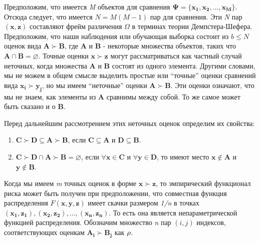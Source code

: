 \documentclass[12pt,a4paper,oneside]{article}
\begin{document}
\par
Предположим, что имеется \emph{M} объектов для сравнения \(\mathbf{\Psi} = \{\mathbf{x_1}, \mathbf{x_2}, \dots, \mathbf{x_M}\}\). 
Отсюда следует, что имеется \(N = M(M - 1)\) пар для сравнения. 
Эти \emph{N} пар \((\mathbf{x}, \mathbf{z})\) составляют фрейм различения \(\Omega\) в терминах теории Демпстера-Шефера. 
Предположим, что наши наблюдения или обучающая выборка состоит из \(b \leq N\) оценок вида \(\mathbf{A} \succ \mathbf{B}\), где \(\mathbf{A}\) и \(\mathbf{B}\) - некоторые множества объектов, таких что \(\mathbf{A} \cap \mathbf{B} = \varnothing\).  
Точные оценки \(\mathbf{x} \succ \mathbf{z}\) могут рассматриваться как частный случай неточных, когда множества \(\mathbf{A}\) и \(\mathbf{B}\) состоят из одного элемента. 
Другими словами, мы не можем в общем смысле выделить простые или ``точные'' оценки сравнений вида \(\mathbf{x_i} \succ \mathbf{y_j}\), но мы имеем ``неточные'' оценки \(\mathbf{A} \succ \mathbf{B}\). 
Эти оценки означают, что мы не знаем, как элементы из \(\mathbf{A}\) сравнимы между собой. 
То же самое может быть сказано и о \(\mathbf{B}\). 

\par
Перед дальнейшим рассмотрением этих неточных оценок определим их свойства:

\begin{enumerate}
\item \(\mathbf{C} \succ \mathbf{D} \subseteq \mathbf{A} \succ \mathbf{B}\), если \(\mathbf{C} \subseteq \mathbf{A}\) и \(\mathbf{D} \subseteq \mathbf{B}\).

\item \(\mathbf{C} \succ \mathbf{D} \cap \mathbf{A} \succ \boldsymbol{B} = \varnothing\), если \(\forall\mathbf{x} \in \mathbf{C}\) и \(\forall\mathbf{y} \in \mathbf{D}\), то имеют место \(\mathbf{x} \notin \mathbf{A}\) и \(\mathbf{y} \notin \mathbf{B}\).
\end{enumerate}


\par 
Когда мы имеем \emph{m} точных оценок в форме \(\mathbf{x} \succ \mathbf{z}\), то эмпирический функционал риска может быть получен при предположении, что совместная функция распределения \(F(\mathbf{x}, \mathbf{y}, \mathbf{z})\) имеет скачки размером \emph{1/n} в точках \((\mathbf{x_1}, \mathbf{z_1}), (\mathbf{x_2}, \mathbf{z_2}), \dots, (\mathbf{x_n}, \mathbf{z_n})\). 
То есть она является непараметрической функцией распределения. 
Обозначим множество \emph{n} пар \((i, j)\) индексов, соответствующих оценкам \(\mathbf{A_i} \succ \mathbf{B_j}\) как \(\mathrm{\rho}\). 
\end{document}
